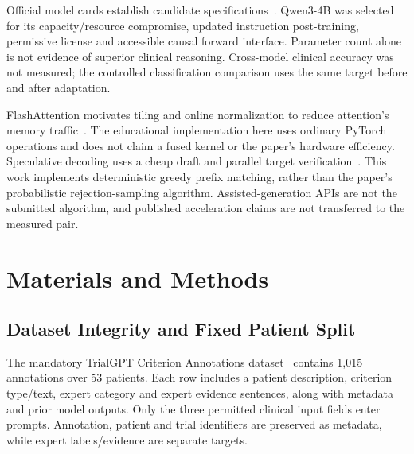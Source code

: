 \documentclass[conference]{IEEEtran}
\begin{document}
\begin{table}[t]\centering\small
\caption{Model alternatives considered. GB estimates concern weights only.}\label{tab:models}
\end{table}
Official model cards establish candidate specifications~\cite{qwen3candidate,qwen7candidate}. Qwen3-4B was selected for its capacity/resource compromise, updated instruction post-training, permissive license and accessible causal forward interface. Parameter count alone is not evidence of superior clinical reasoning. Cross-model clinical accuracy was not measured; the controlled classification comparison uses the same target before and after adaptation.

FlashAttention motivates tiling and online normalization to reduce attention's memory traffic~\cite{flash}. The educational implementation here uses ordinary PyTorch operations and does not claim a fused kernel or the paper's hardware efficiency. Speculative decoding uses a cheap draft and parallel target verification~\cite{specpaper}. This work implements deterministic greedy prefix matching, rather than the paper's probabilistic rejection-sampling algorithm. Assisted-generation APIs are not the submitted algorithm, and published acceleration claims are not transferred to the measured pair.

\section{Materials and Methods}
\subsection{Dataset Integrity and Fixed Patient Split}
The mandatory TrialGPT Criterion Annotations dataset~\cite{dataset} contains 1,015 annotations over 53 patients. Each row includes a patient description, criterion type/text, expert category and expert evidence sentences, along with metadata and prior model outputs. Only the three permitted clinical input fields enter prompts. Annotation, patient and trial identifiers are preserved as metadata, while expert labels/evidence are separate targets.
\end{document}
